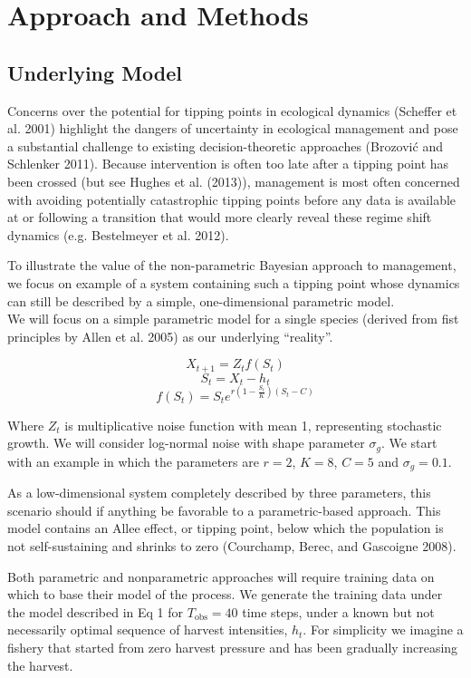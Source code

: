 \documentclass[author-year, review]{elsarticle} %
\begin{document}
\section{Approach and Methods}

\subsection{Underlying Model}

Concerns over the potential for tipping points in ecological dynamics
(Scheffer et al. 2001) highlight the dangers of uncertainty in
ecological management and pose a substantial challenge to existing
decision-theoretic approaches (Brozović and Schlenker 2011). Because
intervention is often too late after a tipping point has been crossed
(but see Hughes et al. (2013)), management is most often concerned with
avoiding potentially catastrophic tipping points before any data is
available at or following a transition that would more clearly reveal
these regime shift dynamics (e.g. Bestelmeyer et al. 2012).

To illustrate the value of the non-parametric Bayesian approach to
management, we focus on example of a system containing such a tipping
point whose dynamics can still be described by a simple, one-dimensional
parametric model.\\We will focus on a simple parametric model for a
single species (derived from fist principles by Allen et al. 2005) as
our underlying ``reality''.

\[X_{t+1} = Z_t f(S_t)  \] \[S_t = X_t - h_t \]
\[f(S_t) = S_t e^{r \left(1 - \frac{S_t}{K}\right)\left(S_t - C\right)} \]

Where $Z_t$ is multiplicative noise function with mean 1, representing
stochastic growth. We will consider log-normal noise with shape
parameter $\sigma_g$. We start with an example in which the parameters
are $r =2$, $K=8$, $C=5$ and $\sigma_g = 0.1$.

As a low-dimensional system completely described by three parameters,
this scenario should if anything be favorable to a parametric-based
approach. This model contains an Allee effect, or tipping point, below
which the population is not self-sustaining and shrinks to zero
(Courchamp, Berec, and Gascoigne 2008).

Both parametric and nonparametric approaches will require training data
on which to base their model of the process. We generate the training
data under the model described in Eq 1 for $T_{\textrm{obs}}=40$ time
steps, under a known but not necessarily optimal sequence of harvest
intensities, $h_t$. For simplicity we imagine a fishery that started
from zero harvest pressure and has been gradually increasing the
harvest.
\end{document}
